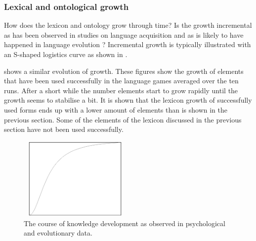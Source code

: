 \subsubsection{Lexical and ontological growth}

How does the lexicon and ontology grow through time? Is the growth incremental as has been observed in studies on language acquisition and as is likely to have happened in language evolution \citep{aitchison:1996}? Incremental growth is typically illustrated with an S-shaped logistics curve as shown in .

 shows a similar evolution of growth. These figures show the growth of elements that have been used successfully in the language games averaged over the ten runs. After a short while the number elements start to grow rapidly until the growth seems to stabilise a bit. It is shown that the lexicon growth of successfully used forms ends up with a lower amount of elements than is shown in the previous section. Some of the elements of the lexicon discussed in the previous section have not been used successfully.

\begin{figure}
	\centerline{\includegraphics[width=5.5cm,height=4cm]{basic/growth.eps}}
	\caption{The course of knowledge development as observed in psychological and evolutionary data.}
	\label{f:st:growth}
\end{figure}


